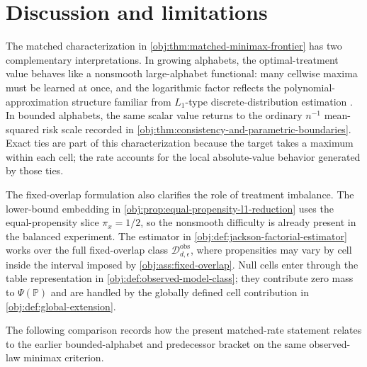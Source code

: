 \section{Discussion and limitations}

The matched characterization in \cref{obj:thm:matched-minimax-frontier} has two complementary interpretations. In growing alphabets, the optimal-treatment value behaves like a nonsmooth large-alphabet functional: many cellwise maxima must be learned at once, and the logarithmic factor reflects the polynomial-approximation structure familiar from \(L_1\)-type discrete-distribution estimation \citep{CaiLow2011L1,JiaoHanWeissman2018L1}. In bounded alphabets, the same scalar value returns to the ordinary \(n^{-1}\) mean-squared risk scale recorded in \cref{obj:thm:consistency-and-parametric-boundaries}. Exact ties are part of this characterization because the target takes a maximum within each cell; the rate accounts for the local absolute-value behavior generated by those ties.

The fixed-overlap formulation also clarifies the role of treatment imbalance. The lower-bound embedding in \cref{obj:prop:equal-propensity-l1-reduction} uses the equal-propensity slice \(\pi_x=1/2\), so the nonsmooth difficulty is already present in the balanced experiment. The estimator in \cref{obj:def:jackson-factorial-estimator} works over the full fixed-overlap class \(\mathcal D_{d,\epsilon}^{\mathrm{obs}}\), where propensities may vary by cell inside the interval imposed by \cref{obj:ass:fixed-overlap}. Null cells enter through the table representation in \cref{obj:def:observed-model-class}; they contribute zero mass to \(\Psi(\mathbb P)\) and are handled by the globally defined cell contribution in \cref{obj:def:global-extension}.

The following comparison records how the present matched-rate statement relates to the earlier bounded-alphabet and predecessor bracket on the same observed-law minimax criterion.

